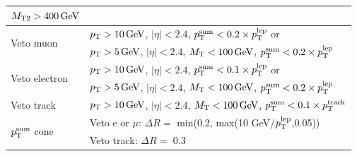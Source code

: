 \begin{table}
\begin{tabular}{ l | l }
      $M_{\mathrm{T2}}>400\,\text{Ge\hspace{-.08em}V}$ \\ \hline
      \multirow{2}{*}{Veto muon} & $p_{\mathrm{T}}>10\,\text{Ge\hspace{-.08em}V}$, $|\eta|<2.4$, $p_{\mathrm{T}}^{\mathrm{sum}} < 0.2 \times p_{\mathrm{T}}^{\mathrm{lep}}$ or \\
      & $p_{\mathrm{T}}>5\,\text{Ge\hspace{-.08em}V}$, $|\eta|<2.4$, $M_{\mathrm{T}}<100\,\text{Ge\hspace{-.08em}V}$, $p_{\mathrm{T}}^{\mathrm{sum}}
      < 0.2 \times p_{\mathrm{T}}^{\mathrm{lep}}$ \\ \hline
      \multirow{2}{*}{Veto electron} & $p_{\mathrm{T}}>10\,\text{Ge\hspace{-.08em}V}$, $|\eta|<2.4$, $p_{\mathrm{T}}^{\mathrm{sum}} < 0.1 \times p_{\mathrm{T}}^{\mathrm{lep}}$ or \\
      & $p_{\mathrm{T}}>5\,\text{Ge\hspace{-.08em}V}$, $|\eta|<2.4$, $M_{\mathrm{T}}<100\,\text{Ge\hspace{-.08em}V}$, $p_{\mathrm{T}}^{\mathrm{sum}}
      < 0.2 \times p_{\mathrm{T}}^{\mathrm{lep}}$ \\ \hline
      Veto track & $p_{\mathrm{T}}>10\,\text{Ge\hspace{-.08em}V}$, $|\eta|<2.4$, $M_{\mathrm{T}}<100\,\text{Ge\hspace{-.08em}V}$,
      $p_{\mathrm{T}}^{\mathrm{sum}} < 0.1 \times p_{\mathrm{T}}^{\mathrm{track}}$ \\ \hline
\multirow{2}{*}{$p_{\mathrm{T}}^{\mathrm{sum}} $ cone} & Veto e or $\mu$: $\Delta R=$ min(0.2, max(10
GeV/$p_{\mathrm{T}}^{\mathrm{lep}}$,0.05))  \\
    & Veto track: $\Delta R=$ 0.3 \\
      \hline
      \end{tabular}
	\label{tbl:selections}
\end{table}

